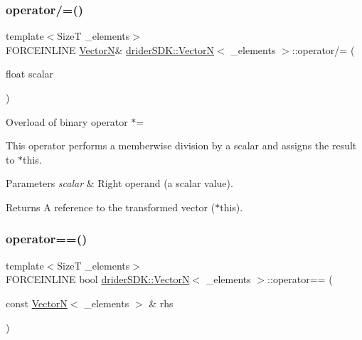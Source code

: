 \subsubsection{\texorpdfstring{operator/=()}{operator/=()}}
{\footnotesize\ttfamily template$<$SizeT \+\_\+elements$>$ \\
F\+O\+R\+C\+E\+I\+N\+L\+I\+NE \hyperlink{classdrider_s_d_k_1_1_vector_n}{VectorN}\& \hyperlink{classdrider_s_d_k_1_1_vector_n}{drider\+S\+D\+K\+::\+VectorN}$<$ \+\_\+elements $>$\+::operator/= (\begin{DoxyParamCaption}\item[{float}]{scalar }\end{DoxyParamCaption})\hspace{0.3cm}{\ttfamily [inline]}}

Overload of binary operator $\ast$=

This operator performs a memberwise division by a scalar and assigns the result to $\ast$this.


\begin{DoxyParams}{Parameters}
{\em scalar} & Right operand (a scalar value).\\
\hline
\end{DoxyParams}
\begin{DoxyReturn}{Returns}
A reference to the transformed vector ($\ast$this). 
\end{DoxyReturn}
\mbox{\label{classdrider_s_d_k_1_1_vector_n_a29db976f9adbfcbee7f88ed80dc039cc}} 
\subsubsection{\texorpdfstring{operator==()}{operator==()}}
{\footnotesize\ttfamily template$<$SizeT \+\_\+elements$>$ \\
F\+O\+R\+C\+E\+I\+N\+L\+I\+NE bool \hyperlink{classdrider_s_d_k_1_1_vector_n}{drider\+S\+D\+K\+::\+VectorN}$<$ \+\_\+elements $>$\+::operator== (\begin{DoxyParamCaption}\item[{const \hyperlink{classdrider_s_d_k_1_1_vector_n}{VectorN}$<$ \+\_\+elements $>$ \&}]{rhs }\end{DoxyParamCaption})\hspace{0.3cm}{\ttfamily [inline]}}

